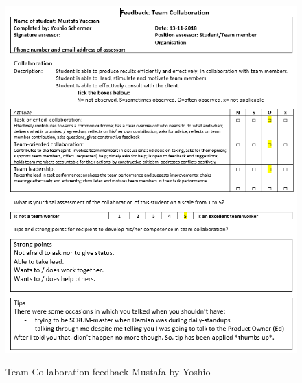 \documentclass[12pt]{article}
\begin{document}
	\begin{figure}[p!]
		\centering
		\includegraphics[width=\columnwidth]{CoopMustafa3.PNG}\\
		\caption{Team Collaboration feedback Mustafa by Yoshio}
	\end{figure}
\end{document}
